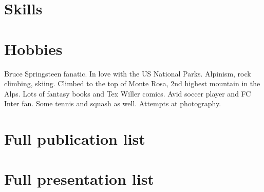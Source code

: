 \section{Skills}


\section{Hobbies}
Bruce Springsteen fanatic. In love with the US National Parks.
Alpinism, rock climbing, skiing.  Climbed to the top of Monte Rosa, 2nd highest mountain in the Alps. Lots of fantasy books and Tex Willer comics.  Avid soccer player and FC Inter fan. Some tennis and squash as well. 
Attempts at photography.

\pagebreak
\section{Full publication list}\vspace{0.2cm} 



\section{Full presentation list}\vspace{0.2cm} 



